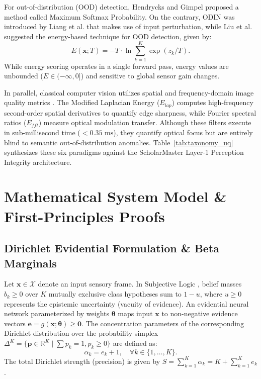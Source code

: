 \documentclass[conference]{IEEEtran}
\begin{document}
For out-of-distribution (OOD) detection, Hendrycks and Gimpel \cite{hendrycks2016baseline} proposed a method called Maximum Softmax Probability. On the contrary, ODIN was introduced by Liang et al. \cite{liang2017enhancing} that makes use of input perturbation, while Liu et al. \cite{liu2020energy} suggested the energy-based technique for OOD detection, given by:
\begin{equation}
E(\mathbf{x}; T) = -T \cdot \ln \sum_{k=1}^K \exp(z_k / T).
\end{equation}
While energy scoring operates in a single forward pass, energy values are unbounded ($E \in (-\infty, 0]$) and sensitive to global sensor gain changes.

In parallel, classical computer vision utilizes spatial and frequency-domain image quality metrics \cite{pech2000diatom, pertuz2013analysis, dodge2016understanding}. The Modified Laplacian Energy ($E_{lap}$) computes high-frequency second-order spatial derivatives to quantify edge sharpness, while Fourier spectral ratios ($E_{fft}$) measure optical modulation transfer. Although these filters execute in sub-millisecond time ($<0.35\text{ ms}$), they quantify optical focus but are entirely blind to semantic out-of-distribution anomalies. Table~\ref{tab:taxonomy_uq} synthesizes these six paradigms against the ScholarMaster Layer-1 Perception Integrity architecture.

\section{Mathematical System Model \& First-Principles Proofs}
\subsection{Dirichlet Evidential Formulation \& Beta Marginals}
Let $\mathbf{x} \in \mathcal{X}$ denote an input sensory frame. In Subjective Logic \cite{jsang2016subjective}, belief masses $b_k \ge 0$ over $K$ mutually exclusive class hypotheses sum to $1 - u$, where $u \ge 0$ represents the epistemic uncertainty (vacuity of evidence). An evidential neural network parameterized by weights $\boldsymbol{\theta}$ maps input $\mathbf{x}$ to non-negative evidence vectors $\mathbf{e} = g(\mathbf{x}; \boldsymbol{\theta}) \ge \mathbf{0}$. The concentration parameters of the corresponding Dirichlet distribution over the probability simplex $\Delta^K = \{\mathbf{p} \in \mathbb{R}^K \mid \sum p_k = 1, p_k \ge 0\}$ are defined as:
\begin{equation}
\alpha_k = e_k + 1, \quad \forall k \in \{1, \dots, K\}.
\end{equation}
The total Dirichlet strength (precision) is given by $S = \sum_{k=1}^K \alpha_k = K + \sum_{k=1}^K e_k$.
\end{document}
